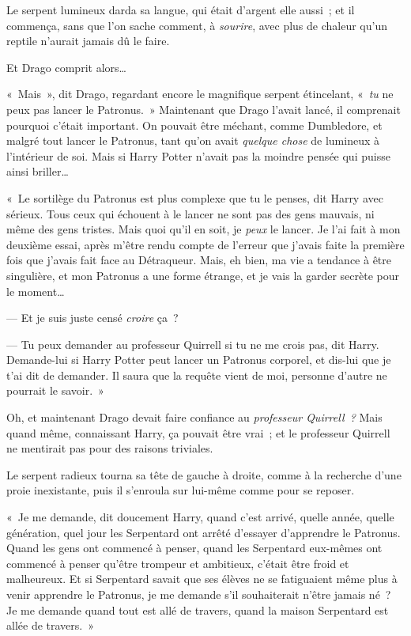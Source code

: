 Le serpent lumineux darda sa langue, qui était d'argent elle aussi~; et il commença, sans que l'on sache comment, à \emph{sourire}, avec plus de chaleur qu'un reptile n'aurait jamais dû le faire.

Et Drago comprit alors…

«~Mais~», dit Drago, regardant encore le magnifique serpent étincelant, «~\emph{tu} ne peux pas lancer le Patronus.~» Maintenant que Drago l'avait lancé, il comprenait pourquoi c'était important. On pouvait être méchant, comme Dumbledore, et malgré tout lancer le Patronus, tant qu'on avait \emph{quelque chose} de lumineux à l'intérieur de soi. Mais si Harry Potter n'avait pas la moindre pensée qui puisse ainsi briller…

«~Le sortilège du Patronus est plus complexe que tu le penses, dit Harry avec sérieux. Tous ceux qui échouent à le lancer ne sont pas des gens mauvais, ni même des gens tristes. Mais quoi qu'il en soit, je \emph{peux} le lancer. Je l'ai fait à mon deuxième essai, après m'être rendu compte de l'erreur que j'avais faite la première fois que j'avais fait face au Détraqueur. Mais, eh bien, ma vie a tendance à être singulière, et mon Patronus a une forme étrange, et je vais la garder secrète pour le moment…

--- Et je suis juste censé \emph{croire} ça~?

--- Tu peux demander au professeur Quirrell si tu ne me crois pas, dit Harry. Demande-lui si Harry Potter peut lancer un Patronus corporel, et dis-lui que je t'ai dit de demander. Il saura que la requête vient de moi, personne d'autre ne pourrait le savoir.~»

Oh, et maintenant Drago devait faire confiance au \emph{professeur Quirrell~?} Mais quand même, connaissant Harry, ça pouvait être vrai~; et le professeur Quirrell ne mentirait pas pour des raisons triviales.

Le serpent radieux tourna sa tête de gauche à droite, comme à la recherche d'une proie inexistante, puis il s'enroula sur lui-même comme pour se reposer.

«~Je me demande, dit doucement Harry, quand c'est arrivé, quelle année, quelle génération, quel jour les Serpentard ont arrêté d'essayer d'apprendre le Patronus. Quand les gens ont commencé à penser, quand les Serpentard eux-mêmes ont commencé à penser qu'être trompeur et ambitieux, c'était être froid et malheureux. Et si Serpentard savait que ses élèves ne se fatiguaient même plus à venir apprendre le Patronus, je me demande s'il souhaiterait n'être jamais né~? Je me demande quand tout est allé de travers, quand la maison Serpentard est allée de travers.~»

